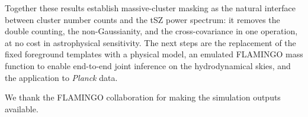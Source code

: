 \documentclass[aps,prd,twocolumn,superscriptaddress,nofootinbib,floatfix]{revtex4-2}
\begin{document}
Together these results establish massive-cluster masking as the natural interface between cluster number counts and the tSZ power spectrum: it removes the double counting, the non-Gaussianity, and the cross-covariance in one operation, at no cost in astrophysical sensitivity.
The next steps are the replacement of the fixed foreground templates with a physical model, an emulated FLAMINGO mass function to enable end-to-end joint inference on the hydrodynamical skies, and the application to \textit{Planck} data.

\begin{acknowledgments}
We thank the FLAMINGO collaboration for making the simulation outputs available.
\end{acknowledgments}


\end{document}
